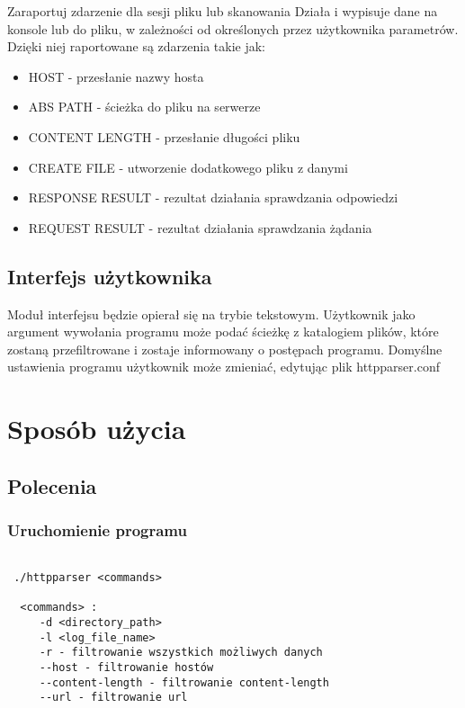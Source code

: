 \documentclass[a4paper,11pt]{report}
\begin{document}
Zaraportuj zdarzenie dla sesji pliku lub skanowania
Działa i wypisuje dane na konsole lub do pliku, w zależności od określonych przez użytkownika parametrów.
Dzięki niej raportowane są zdarzenia takie jak:

\begin{itemize}
\item HOST - przesłanie nazwy hosta
\item ABS PATH - ścieżka do pliku na serwerze
\item CONTENT LENGTH - przesłanie długości pliku
\item CREATE FILE - utworzenie dodatkowego pliku z danymi
\item RESPONSE RESULT - rezultat działania sprawdzania odpowiedzi
\item REQUEST RESULT - rezultat działania sprawdzania żądania
\end{itemize}

\section{Interfejs użytkownika}

Moduł interfejsu będzie opierał się na trybie tekstowym. Użytkownik jako argument wywołania programu może podać ścieżkę z katalogiem plików, które zostaną przefiltrowane i zostaje informowany o postępach programu.
Domyślne ustawienia programu użytkownik może zmieniać, edytując plik httpparser.conf

\chapter{Sposób użycia}

\section{Polecenia}

\subsection{Uruchomienie programu}

\begin{lstlisting}

 ./httpparser <commands>
  
  <commands> : 
     -d <directory_path>
     -l <log_file_name>
     -r - filtrowanie wszystkich możliwych danych
     --host - filtrowanie hostów
     --content-length - filtrowanie content-length
     --url - filtrowanie url
     
\end{lstlisting}
\end{document}
